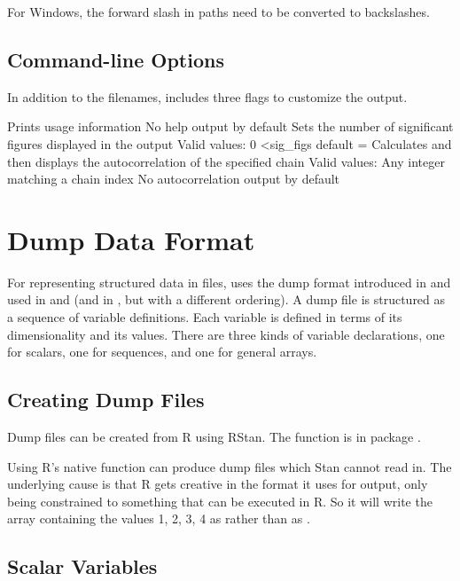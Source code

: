For Windows, the forward slash in paths need to be converted to backslashes.

\section{Command-line Options}

In addition to the filenames,  includes three flags to customize the output.  

\begin{description}
{Prints usage information}
{No help output by default}
%
{Sets the number of significant figures displayed in the output}
{Valid values: 0 \textless sig\_figs}
{default =  }
%
{Calculates and then displays the autocorrelation of the specified chain}
{Valid values: Any integer matching a chain index}
{No autocorrelation output by default}
%
\end{description}

\chapter{Dump Data Format}\label{dump.chapter}

\noindent 
For representing structured data in files, \Stan uses the dump format
introduced in \SPLUS and used in \R and \JAGS (and in \BUGS, but with
a different ordering).   A dump file is structured as a sequence of
variable definitions.  Each variable is defined in terms of its
dimensionality and its values.   There are three kinds of variable
declarations, one for scalars, one for sequences, and one for general
arrays.

\section{Creating Dump Files}

Dump files can be created from R using RStan.  The function is
 in package .

Using R's native  function can produce dump files which
Stan cannot read in.  The underlying cause is that R gets creative in
the format it uses for output, only being constrained to something
that can be executed in R.  So it will write the array containing the
values 1, 2, 3, 4 as  rather than as .

\section{Scalar Variables}

